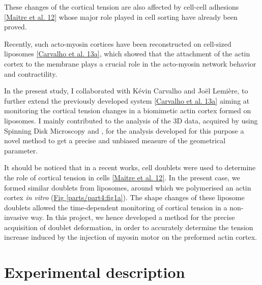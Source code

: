 \documentclass[A4paperpaper,11pt,english]{sphinxmanual}
\begin{document}
These changes of the cortical tension are also affected by cell-cell
adhesions {\hyperref[parts/part4:maitre2012]{{[}Maitre et al. 12{]}}} whose major role played in cell sorting have already been proved.

Recently, such acto-myosin cortices have been reconstructed on cell-sized
liposomes {\hyperref[parts/part4:carvalho2013a]{{[}Carvalho et al. 13a{]}}}, which showed that the attachment of the actin
cortex to the membrane plays a crucial role in the acto-myosin network behavior and contractility.

In the present study, I collaborated with Kévin Carvalho and Joël Lemière, to
further extend the previously developed system {\hyperref[parts/part4:carvalho2013a]{{[}Carvalho et al. 13a{]}}}
aiming at monitoring the cortical tension changes in a biomimetic actin cortex formed
on liposomes. I mainly contributed to the analysis of the 3D data, acquired by using Spinning Disk Microscopy and , for the analysis developed for this purpose a
novel method to get a precise and unbiased measure of the geometrical
parameter.

It should be noticed that in a recent works, cell doublets were used to determine the role of cortical tension in cells {\hyperref[parts/part4:maitre2012]{{[}Maitre et al. 12{]}}}. In the present case, we formed similar doublets from liposomes,
around which we polymerised an actin cortex \emph{in vitro} (\hyperref[parts/part4:fig1a]{Fig  \ref*{parts/part4:fig1a}}). The
shape changes of these liposome doublets allowed the time-dependent monitoring of
cortical tension in a non-invasive way.  In this project, we hence developed a
method for the precise acquisition of doublet deformation, in order to accurately determine
the tension increase induced by the injection of myosin motor on
the preformed actin cortex.


\section{Experimental description}
\label{parts/part4:experimental-description}
\end{document}
